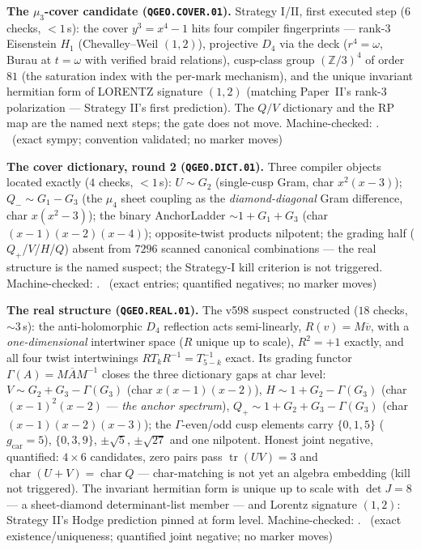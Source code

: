 \documentclass[11pt,a4paper]{article}
\newcommand{\gcar}{g_{\mathrm{car}}}
\theoremstyle{definition}
\begin{document}
\par\smallskip\noindent\textbf{The $\mu_3$-cover candidate
(\texttt{QGEO.COVER.01}).}
Strategy I/II, first executed step ($6$ checks, $<1$\,s): the cover
$y^3=x^4-1$ hits four compiler fingerprints --- rank-3 Eisenstein
$H_1$ (Chevalley--Weil $(1,2)$), projective $D_4$ via the deck
($r^4=\omega$, Burau at $t=\omega$ with verified braid relations),
cusp-class group $(\mathbb{Z}/3)^4$ of order $81$ (the saturation
index with the per-mark mechanism), and the unique invariant hermitian
form of LORENTZ signature $(1,2)$ (matching Paper~II's rank-3
polarization --- Strategy II's first prediction).  The $Q/V$
dictionary and the RP map are the named next steps; the gate does not
move. Machine-checked: .
\mE\ (exact sympy; convention validated; no marker moves)
\par\smallskip

\par\smallskip\noindent\textbf{The cover dictionary, round 2
(\texttt{QGEO.DICT.01}).}
Three compiler objects located exactly ($4$ checks, $<1$\,s):
$U\sim G_2$ (single-cusp Gram, char $x^2(x-3)$); $Q_-\sim G_1-G_3$
(the $\mu_4$ sheet coupling as the \emph{diamond-diagonal} Gram
difference, char $x(x^2-3)$); the binary AnchorLadder
$\sim1+G_1+G_3$ (char $(x-1)(x-2)(x-4)$); opposite-twist products
nilpotent; the grading half ($Q_+$/$V$/$H$/$Q$) absent from $7296$
scanned canonical combinations --- the real structure is the named
suspect; the Strategy-I kill criterion is not triggered.
Machine-checked: .
\mE\ (exact entries; quantified negatives; no marker moves)
\par\smallskip

\par\smallskip\noindent\textbf{The real structure
(\texttt{QGEO.REAL.01}).}
The v598 suspect constructed ($18$ checks, ${\sim}3$\,s): the
anti-holomorphic $D_4$ reflection acts semi-linearly,
$R(v)=M\overline{v}$, with a \emph{one-dimensional} intertwiner space
($R$ unique up to scale), $R^2=+1$ exactly, and all four twist
intertwinings $RT_kR^{-1}=T_{5-k}^{-1}$ exact.  Its grading functor
$\Gamma(A)=M\overline{A}M^{-1}$ closes the three dictionary gaps at
char level: $V\sim G_2+G_3-\Gamma(G_3)$ (char $x(x-1)(x-2)$),
$H\sim 1+G_2-\Gamma(G_3)$ (char $(x-1)^2(x-2)$ --- \emph{the anchor
spectrum}), $Q_+\sim 1+G_2+G_3-\Gamma(G_3)$ (char $(x-1)(x-2)(x-3)$);
the $\Gamma$-even/odd cusp elements carry $\{0,1,5\}$ ($\gcar=5$),
$\{0,3,9\}$, $\pm\sqrt5$, $\pm\sqrt{27}$ and one nilpotent.  Honest
joint negative, quantified: $4\times6$ candidates, zero pairs pass
$\operatorname{tr}(UV)=3$ and $\operatorname{char}(U{+}V)=
\operatorname{char}Q$ --- char-matching is not yet an algebra
embedding (kill not triggered).  The invariant hermitian form is
unique up to scale with $\det J=8$ --- a sheet-diamond
determinant-list member --- and Lorentz signature $(1,2)$: Strategy
II's Hodge prediction pinned at form level.
Machine-checked: .
\mE\ (exact existence/uniqueness; quantified joint negative; no
marker moves)
\par\smallskip
\end{document}
